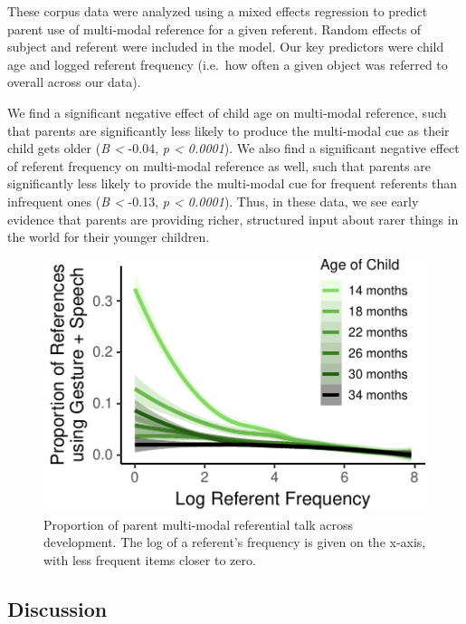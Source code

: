 \documentclass[10pt, letterpaper]{article}
\newenvironment{CodeChunk}{}{}
\begin{document}
These corpus data were analyzed using a mixed effects regression to
predict parent use of multi-modal reference for a given referent. Random
effects of subject and referent were included in the model. Our key
predictors were child age and logged referent frequency (i.e.~how often
a given object was referred to overall across our data).

We find a significant negative effect of child age on multi-modal
reference, such that parents are significantly less likely to produce
the multi-modal cue as their child gets older (\emph{B \textless{}}
-0.04, \emph{p \textless{} 0.0001}). We also find a significant negative
effect of referent frequency on multi-modal reference as well, such that
parents are significantly less likely to provide the multi-modal cue for
frequent referents than infrequent ones (\emph{B \textless{}} -0.13,
\emph{p \textless{} 0.0001}). Thus, in these data, we see early evidence
that parents are providing richer, structured input about rarer things
in the world for their younger children.

\begin{CodeChunk}
\begin{figure}[tb]

{\centering \includegraphics{figs/corpus_plot-1} 

}

\caption[Proportion of parent multi-modal referential talk across development]{Proportion of parent multi-modal referential talk across development. The log of a referent's frequency is given on the x-axis, with less frequent items closer to zero.}\label{fig:corpus_plot}
\end{figure}
\end{CodeChunk}

\subsection{Discussion}\label{discussion}
\end{document}
